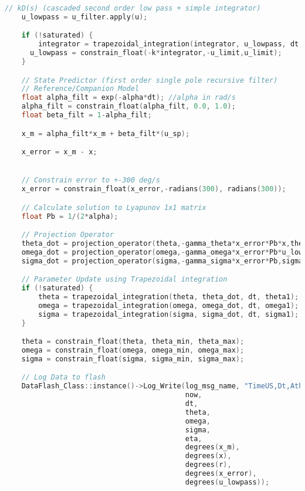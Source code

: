 \begin{lstlisting}[language=c++]
    // kD(s) (cascaded second order low pass + simple integrator)
    u_lowpass = u_filter.apply(u);

    if (!saturated) {
    	integrator = trapezoidal_integration(integrator, u_lowpass, dt, out1);
      u_lowpass = constrain_float(-k*integrator,-u_limit,u_limit);
    }

    // State Predictor (first order single pole recursive filter)
    // Reference/Companion Model
    float alpha_filt = exp(-alpha*dt); //alpha in rad/s
    alpha_filt = constrain_float(alpha_filt, 0.0, 1.0);
    float beta_filt = 1-alpha_filt;

    x_m = alpha_filt*x_m + beta_filt*(u_sp);

    x_error = x_m - x;


    // Constrain error to +-300 deg/s
    x_error = constrain_float(x_error,-radians(300), radians(300));

    // Calculate solution to Lyapunov 1x1 matrix
    float Pb = 1/(2*alpha);

    // Projection Operator
    theta_dot = projection_operator(theta,-gamma_theta*x_error*Pb*x,theta_epsilon,theta_max,theta_min);
    omega_dot = projection_operator(omega,-gamma_omega*x_error*Pb*u_lowpass,omega_epsilon,omega_max,omega_min);
    sigma_dot = projection_operator(sigma,-gamma_sigma*x_error*Pb,sigma_epsilon,sigma_max,sigma_min);

    // Parameter Update using Trapezoidal integration
    if (!saturated) {
        theta = trapezoidal_integration(theta, theta_dot, dt, theta1);
        omega = trapezoidal_integration(omega, omega_dot, dt, omega1);
        sigma = trapezoidal_integration(sigma, sigma_dot, dt, sigma1);
    }

    theta = constrain_float(theta, theta_min, theta_max);
    omega = constrain_float(omega, omega_min, omega_max);
    sigma = constrain_float(sigma, sigma_min, sigma_max);

    // Log Data to flash
    DataFlash_Class::instance()->Log_Write(log_msg_name, "TimeUS,Dt,Atheta,Aomega,Asigma,Aeta,Axm,Ax,Ar,Axerr,AuL", "Qffffffffff",
                                           now,
                                           dt,
                                           theta,
                                           omega,
                                           sigma,
                                           eta,
                                           degrees(x_m),
                                           degrees(x),
                                           degrees(r),
                                           degrees(x_error),
                                           degrees(u_lowpass));
 


\end{lstlisting}
